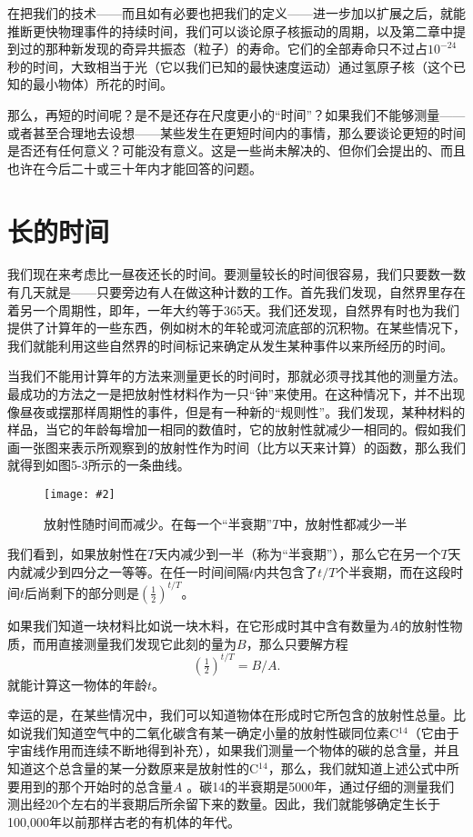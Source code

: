 \documentclass[12pt,oneside]{book}
\newenvironment{fig}[2][1]
{\begin{figure}[H]
\centering
\texttt{[image: \#2]}}
{\end{figure}}
\begin{document}
在把我们的技术——而且如有必要也把我们的定义——进一步加以扩展之后，就能推断更快物理事件的持续时间，我们可以谈论原子核振动的周期，以及第二章中提到过的那种新发现的奇异共振态（粒子）的寿命。它们的全部寿命只不过占$ 10^{-24} $秒的时间，大致相当于光（它以我们已知的最快速度运动）通过氢原子核（这个已知的最小物体）所花的时间。

那么，再短的时间呢？是不是还存在尺度更小的“时间”？如果我们不能够测量——或者甚至合理地去设想——某些发生在更短时间内的事情，那么要谈论更短的时间是否还有任何意义？可能没有意义。这是一些尚未解决的、但你们会提出的、而且也许在今后二十或三十年内才能回答的问题。


\section{长的时间}
我们现在来考虑比一昼夜还长的时间。要测量较长的时间很容易，我们只要数一数有几天就是——只要旁边有人在做这种计数的工作。首先我们发现，自然界里存在着另一个周期性，即年，一年大约等于365天。我们还发现，自然界有时也为我们提供了计算年的一些东西，例如树木的年轮或河流底部的沉积物。在某些情况下，我们就能利用这些自然界的时间标记来确定从发生某种事件以来所经历的时间。

当我们不能用计算年的方法来测量更长的时间时，那就必须寻找其他的测量方法。最成功的方法之一是把放射性材料作为一只“钟”来使用。在这种情况下，并不出现像昼夜或摆那样周期性的事件，但是有一种新的“规则性”。我们发现，某种材料的样品，当它的年龄每增加一相同的数值时，它的放射性就减少一相同的。假如我们画一张图来表示所观察到的放射性作为时间（比方以天来计算）的函数，那么我们就得到如图5-3所示的一条曲线。
\begin{fig}{放射性随时间而减少}
\caption{\footnotesize 放射性随时间而减少。在每一个“半衰期”$ T $中，放射性都减少一半}
\label{fig:放射性随时间而减少}
\end{fig}
我们看到，如果放射性在$ T $天内减少到一半（称为“半衰期”），那么它在另一个$ T $天内就减少到四分之一等等。在任一时间间隔$ t $内共包含了$ t/T $个半衰期，而在这段时间$ t $后尚剩下的部分则是$ (\tfrac{1}{2})^{t/T} $。

如果我们知道一块材料比如说一块木料，在它形成时其中含有数量为$ A $的放射性物质，而用直接测量我们发现它此刻的量为$ B $，那么只要解方程
\begin{equation*}
(\tfrac{1}{2})^{t/T}=B/A.
\end{equation*}
就能计算这一物体的年龄$ t $。

幸运的是，在某些情况中，我们可以知道物体在形成时它所包含的放射性总量。比如说我们知道空气中的二氧化碳含有某一确定小量的放射性碳同位素C$ ^{14} $（它由于宇宙线作用而连续不断地得到补充），如果我们测量一个物体的碳的总含量，并且知道这个总含量的某一分数原来是放射性的C$ ^{14} $，那么，我们就知道上述公式中所要用到的那个开始时的总含量$ A $ 。碳14的半衰期是5000年，通过仔细的测量我们测出经20个左右的半衰期后所余留下来的数量。因此，我们就能够确定生长于100,000年以前那样古老的有机体的年代。
\end{document}
